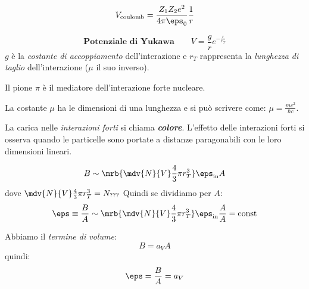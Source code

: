 \begin{equation}
	V_\text{coulomb} = \frac{Z_1 Z_2 e^2}{4 \pi \eps_0} \frac{1}{r}
\end{equation}

\begin{equation}
	\textbf{Potenziale di Yukawa}\qquad
	\boxed{
		V = \frac{g}{r} e^{- \frac{r}{r_T}}
	}
\end{equation}
$g$ è la \textit{costante di accoppiamento} dell'interazione e $r_T$
rappresenta la \textit{lunghezza di taglio} dell'interazione ($\mu$ il suo
inverso).
\begin{note}[]
  Il pione $\pi$ è il mediatore dell'interazione forte nucleare.
\end{note}
\begin{note}[]
  La costante $\mu$ ha le dimensioni di una lunghezza e si può scrivere come:
  $\mu = \frac{m c^2}{\hbar c}$.
\end{note}
\begin{note}[]
	La carica nelle \textit{interazioni forti} si chiama \textit{\textbf{colore}}.
	L'effetto delle interazioni forti si osserva quando le particelle sono portate
	a distanze paragonabili con le loro dimensioni lineari.
\end{note}

\begin{equation}
	B \sim \mrb{\mdv{N}{V} \frac{4}{3} \pi r_T^3} \eps_\text{in} A
\end{equation}
dove $\mdv{N}{V} \frac{4}{3} \pi r_T^3 = N_\text{???}$
Quindi se dividiamo per $A$:
\begin{equation}
	\eps \equiv \frac{B}{A} \sim \mrb{\mdv{N}{V} \frac{4}{3} \pi r_T^3}
	\eps_\text{in} \frac{A}{A} = \text{const}
\end{equation}


Abbiamo il \textit{termine di volume}:
\begin{equation}
	B = a_V A
\end{equation}
quindi:
\begin{equation}
	\eps = \frac{B}{A} = a_V
\end{equation}

